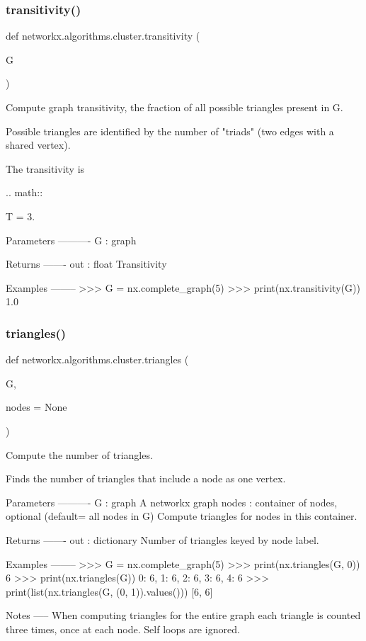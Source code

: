 \subsubsection{\texorpdfstring{transitivity()}{transitivity()}}
{\footnotesize\ttfamily def networkx.\+algorithms.\+cluster.\+transitivity (\begin{DoxyParamCaption}\item[{}]{G }\end{DoxyParamCaption})}

\begin{DoxyVerb}Compute graph transitivity, the fraction of all possible triangles
present in G.

Possible triangles are identified by the number of "triads"
(two edges with a shared vertex).

The transitivity is

.. math::

    T = 3.

Parameters
----------
G : graph

Returns
-------
out : float
   Transitivity

Examples
--------
>>> G = nx.complete_graph(5)
>>> print(nx.transitivity(G))
1.0
\end{DoxyVerb}
 \mbox{\label{namespacenetworkx_1_1algorithms_1_1cluster_a945fd7d36335c0f46a2ec05abccd30fb}} 
\subsubsection{\texorpdfstring{triangles()}{triangles()}}
{\footnotesize\ttfamily def networkx.\+algorithms.\+cluster.\+triangles (\begin{DoxyParamCaption}\item[{}]{G,  }\item[{}]{nodes = {\ttfamily None} }\end{DoxyParamCaption})}

\begin{DoxyVerb}Compute the number of triangles.

Finds the number of triangles that include a node as one vertex.

Parameters
----------
G : graph
   A networkx graph
nodes : container of nodes, optional (default= all nodes in G)
   Compute triangles for nodes in this container.

Returns
-------
out : dictionary
   Number of triangles keyed by node label.

Examples
--------
>>> G = nx.complete_graph(5)
>>> print(nx.triangles(G, 0))
6
>>> print(nx.triangles(G))
{0: 6, 1: 6, 2: 6, 3: 6, 4: 6}
>>> print(list(nx.triangles(G, (0, 1)).values()))
[6, 6]

Notes
-----
When computing triangles for the entire graph each triangle is counted
three times, once at each node.  Self loops are ignored.\end{DoxyVerb}
 